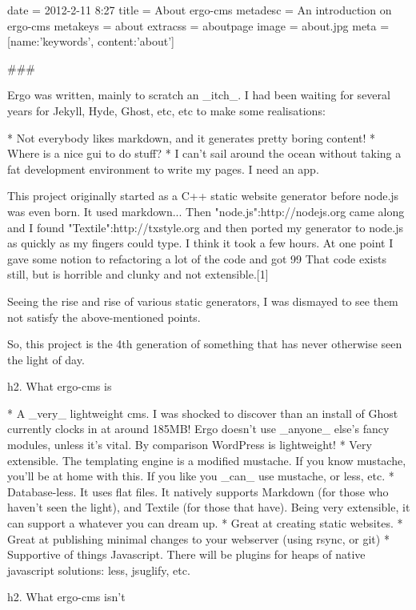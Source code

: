 date = 2012-2-11 8:27
title = About ergo-cms
metadesc = An introduction on ergo-cms
metakeys = about
extracss = aboutpage
image = about.jpg
meta = {[{name:'keywords', content:'about'}]}

###

Ergo was written, mainly to scratch an _itch_. I had been waiting for several years for Jekyll, Hyde, Ghost, etc, etc to make some realisations:

* Not everybody likes markdown, and it generates pretty boring content!
* Where is a nice gui to do stuff?
* I can't sail around the ocean without taking a fat development environment to write my pages. I need an app.

This project originally started as a C++ static website generator before node.js was even born. It used markdown... 
Then "node.js":http://nodejs.org came along and I found "Textile":http://txstyle.org and then ported my generator to node.js as quickly as my fingers could type. I think it took a few hours. 
At one point I gave some notion to refactoring a lot of the code and got 99%
That code exists still, but is horrible and clunky and not extensible.[1]

Seeing the rise and rise of various static generators, I was dismayed to see them not satisfy the above-mentioned points.

So, this project is the 4th generation of something that has never otherwise seen the light of day.


h2. What ergo-cms is

* A _very_ lightweight cms. I was shocked to discover than an install of Ghost currently clocks in at around 185MB! Ergo doesn't use _anyone_ else's fancy modules, unless it's vital. By comparison WordPress is lightweight!
* Very extensible. The templating engine is a modified mustache. If you know mustache, you'll be at home with this. If you like you _can_ use mustache, or less, etc.
* Database-less. It uses flat files. It natively supports Markdown (for those who haven't seen the light), and Textile (for those that have). Being very extensible, it can support a whatever you can dream up.
* Great at creating static websites. 
* Great at publishing minimal changes to your webserver (using rsync, or git)
* Supportive of things Javascript. There will be plugins for heaps of native javascript solutions: less, jsuglify, etc.

h2. What ergo-cms isn't

